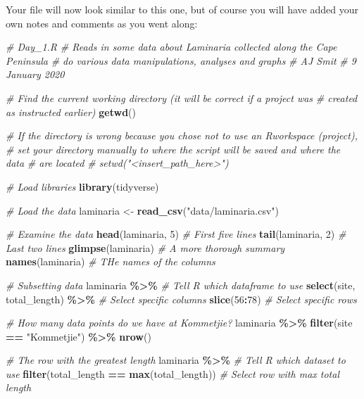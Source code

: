 \documentclass[
]{book}
\newenvironment{Shaded}{\begin{snugshade}}{\end{snugshade}}
\newcommand{\CommentTok}[1]{\textcolor[rgb]{0.56,0.35,0.01}{\textit{#1}}}
\newcommand{\DecValTok}[1]{\textcolor[rgb]{0.00,0.00,0.81}{#1}}
\newcommand{\KeywordTok}[1]{\textcolor[rgb]{0.13,0.29,0.53}{\textbf{#1}}}
\newcommand{\NormalTok}[1]{#1}
\newcommand{\OperatorTok}[1]{\textcolor[rgb]{0.81,0.36,0.00}{\textbf{#1}}}
\newcommand{\StringTok}[1]{\textcolor[rgb]{0.31,0.60,0.02}{#1}}
\begin{document}
Your file will now look similar to this one, but of course you will have added your own notes and comments as you went along:

\begin{Shaded}
\begin{Highlighting}[]
\CommentTok{\# Day\_1.R}
\CommentTok{\# Reads in some data about Laminaria collected along the Cape Peninsula}
\CommentTok{\# do various data manipulations, analyses and graphs}
\CommentTok{\# AJ Smit}
\CommentTok{\# 9 January 2020}

\CommentTok{\# Find the current working directory (it will be correct if a project was}
\CommentTok{\# created as instructed earlier)}
\KeywordTok{getwd}\NormalTok{()}

\CommentTok{\# If the directory is wrong because you chose not to use an Rworkspace (project),}
\CommentTok{\# set your directory manually to where the script will be saved and where the data}
\CommentTok{\# are located}
\CommentTok{\# setwd("<insert\_path\_here>")}

\CommentTok{\# Load libraries}
\KeywordTok{library}\NormalTok{(tidyverse)}

\CommentTok{\# Load the data}
\NormalTok{laminaria <{-}}\StringTok{ }\KeywordTok{read\_csv}\NormalTok{(}\StringTok{"data/laminaria.csv"}\NormalTok{)}

\CommentTok{\# Examine the data}
\KeywordTok{head}\NormalTok{(laminaria, }\DecValTok{5}\NormalTok{) }\CommentTok{\# First five lines}
\KeywordTok{tail}\NormalTok{(laminaria, }\DecValTok{2}\NormalTok{) }\CommentTok{\# Last two lines}
\KeywordTok{glimpse}\NormalTok{(laminaria) }\CommentTok{\# A more thorough summary}
\KeywordTok{names}\NormalTok{(laminaria) }\CommentTok{\# THe names of the columns}

\CommentTok{\# Subsetting data}
\NormalTok{laminaria }\OperatorTok{\%>\%}\StringTok{ }\CommentTok{\# Tell R which dataframe to use}
\StringTok{  }\KeywordTok{select}\NormalTok{(site, total\_length) }\OperatorTok{\%>\%}\StringTok{ }\CommentTok{\# Select specific columns}
\StringTok{  }\KeywordTok{slice}\NormalTok{(}\DecValTok{56}\OperatorTok{:}\DecValTok{78}\NormalTok{) }\CommentTok{\# Select specific rows}

\CommentTok{\# How many data points do we have at Kommetjie?}
\NormalTok{laminaria }\OperatorTok{\%>\%}
\StringTok{  }\KeywordTok{filter}\NormalTok{(site }\OperatorTok{==}\StringTok{ "Kommetjie"}\NormalTok{) }\OperatorTok{\%>\%}
\StringTok{  }\KeywordTok{nrow}\NormalTok{()}

\CommentTok{\# The row with the greatest length}
\NormalTok{laminaria }\OperatorTok{\%>\%}\StringTok{ }\CommentTok{\# Tell R which dataset to use}
\StringTok{  }\KeywordTok{filter}\NormalTok{(total\_length }\OperatorTok{==}\StringTok{ }\KeywordTok{max}\NormalTok{(total\_length)) }\CommentTok{\# Select row with max total length}
\end{Highlighting}
\end{Shaded}
\end{document}

